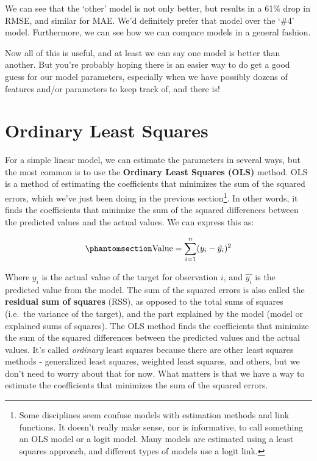 \documentclass[
  letterpaper,
]{krantz}
\begin{document}
We can see that the `other' model is not only better, but results in a
61\% drop in RMSE, and similar for MAE. We'd definitely prefer that
model over the `\#4' model. Furthermore, we can see how we can compare
models in a general fashion.

Now all of this is useful, and at least we can say one model is better
than another. But you're probably hoping there is an easier way to do
get a good guess for our model parameters, especially when we have
possibly dozens of features and/or parameters to keep track of, and
there is!

\section{Ordinary Least Squares}\label{sec-estim-ols}

For a simple linear model, we can estimate the parameters in several
ways, but the most common is to use the \textbf{Ordinary Least Squares
(OLS)} method. OLS is a method of estimating the coefficients that
minimizes the sum of the squared errors, which we've just been doing in
the previous section\footnote{Some disciplines seem confuse models with
  estimation methods and link functions. It doesn't really make sense,
  nor is informative, to call something an OLS model or a logit model.
  Many models are estimated using a least squares approach, and
  different types of models use a logit link.}. In other words, it finds
the coefficients that minimize the sum of the squared differences
between the predicted values and the actual values. We can express this
as:

\begin{equation}\phantomsection\label{eq-ols}{
\textrm{Value} = \sum_{i=1}^{n} (y_i - \hat{y_i})^2
}\end{equation}

Where \(y_i\) is the actual value of the target for observation \(i\),
and \(\hat{y_i}\) is the predicted value from the model. The sum of the
squared errors is also called the \textbf{residual sum of squares}
(RSS), as opposed to the total sums of squares (i.e.~the variance of the
target), and the part explained by the model (model or explained sums of
squares). The OLS method finds the coefficients that minimize the sum of
the squared differences between the predicted values and the actual
values. It's called \emph{ordinary} least squares because there are
other least squares methods - generalized least squares, weighted least
squares, and others, but we don't need to worry about that for now. What
matters is that we have a way to estimate the coefficients that
minimizes the sum of the squared errors.
\end{document}
